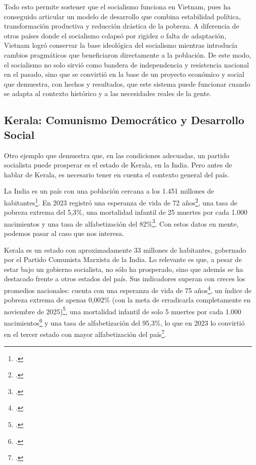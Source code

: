 \documentclass[12pt, letterpaper]{article}
\begin{document}
Todo esto permite sostener que el socialismo funciona en Vietnam, pues ha conseguido articular un modelo de desarrollo que combina estabilidad política, transformación productiva y reducción drástica de la pobreza. A diferencia de otros países donde el socialismo colapsó por rigidez o falta de adaptación, Vietnam logró conservar la base ideológica del socialismo mientras introducía cambios pragmáticos que beneficiaron directamente a la población. De este modo, el socialismo no solo sirvió como bandera de independencia y resistencia nacional en el pasado, sino que se convirtió en la base de un proyecto económico y social que demuestra, con hechos y resultados, que este sistema puede funcionar cuando se adapta al contexto histórico y a las necesidades reales de la gente.

\subsection*{Kerala: Comunismo Democrático y Desarrollo Social}
Otro ejemplo que demuestra que, en las condiciones adecuadas, un partido socialista puede prosperar es el estado de Kerala, en la India. Pero antes de hablar de Kerala, es necesario tener en cuenta el contexto general del país.

La India es un país con una población cercana a los 1.451 millones de habitantes\footcite{datosmacro_sf}. En 2023 registró una esperanza de vida de 72 años\footcite{banco_mundial_sf_india}, una tasa de pobreza extrema del 5,3\%, una mortalidad infantil de 25 muertes por cada 1.000 nacimientos y una tasa de alfabetización del 82\%\footcite{datosmacro_sf}. Con estos datos en mente, podemos pasar al caso que nos interesa.

Kerala es un estado con aproximadamente 33 millones de habitantes, gobernado por el Partido Comunista Marxista de la India. Lo relevante es que, a pesar de estar bajo un gobierno socialista, no sólo ha prosperado, sino que además se ha destacado frente a otros estados del país. Sus indicadores superan con creces los promedios nacionales: cuenta con una esperanza de vida de 75 años\footcite{testbook_sf}, un índice de pobreza extrema de apenas 0,002\% (con la meta de erradicarla completamente en noviembre de 2025)\footcite{thesouthfirst_2024}, una mortalidad infantil de solo 5 muertes por cada 1.000 nacimientos\footcite{themorningcontext_2023} y una tasa de alfabetización del 95,3\%, lo que en 2023 lo convirtió en el tercer estado con mayor alfabetización del país\footcite{jagran_josh_2024}.
\end{document}
